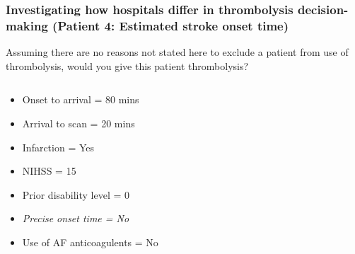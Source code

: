 \documentclass{beamer}
\begin{document}
\begin{frame}
\frametitle{Investigating how hospitals differ in thrombolysis decision-making (Patient 4: Estimated stroke onset time)}

Assuming there are no reasons not stated here to exclude a patient from use of thrombolysis, would you give this patient thrombolysis?

\vspace{3mm}

\begin{columns}
    \begin{column}{0.6\textwidth}
        \begin{itemize}
            \item Onset to arrival = 80 mins
            \item Arrival to scan = 20 mins
            \item Infarction = Yes
            \item NIHSS = 15
            \item Prior disability level = 0
            \item \emph{Precise onset time = No}
            \item Use of AF anticoagulents = No
        \end{itemize}
    \end{column}
    
    \begin{column}{0.4\textwidth}
    
    \end{column}

\end{columns}
\end{frame}
\end{document}
